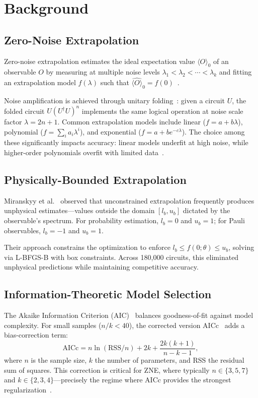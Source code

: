 \section{Background}
\label{sec:background}

\subsection{Zero-Noise Extrapolation}

Zero-noise extrapolation estimates the ideal expectation value $\langle O \rangle_0$ of an observable $O$ by measuring at multiple noise levels $\lambda_1 < \lambda_2 < \cdots < \lambda_k$ and fitting an extrapolation model $f(\lambda)$ such that $\hat{\langle O \rangle}_0 = f(0)$~\cite{Temme2017, Li2017}.

Noise amplification is achieved through unitary folding~\cite{GiurgicaTiron2020}: given a circuit $U$, the folded circuit $U(U^\dagger U)^n$ implements the same logical operation at noise scale factor $\lambda = 2n + 1$. Common extrapolation models include linear ($f = a + b\lambda$), polynomial ($f = \sum_i a_i \lambda^i$), and exponential ($f = a + be^{-c\lambda}$). The choice among these significantly impacts accuracy: linear models underfit at high noise, while higher-order polynomials overfit with limited data~\cite{Cai2023}.

\subsection{Physically-Bounded Extrapolation}

Miranskyy et al.~\cite{Miranskyy2026} observed that unconstrained extrapolation frequently produces unphysical estimates---values outside the domain $[l_b, u_b]$ dictated by the observable's spectrum. For probability estimation, $l_b = 0$ and $u_b = 1$; for Pauli observables, $l_b = -1$ and $u_b = 1$.

Their approach constrains the optimization to enforce $l_b \leq f(0;\theta) \leq u_b$, solving via L-BFGS-B with box constraints. Across 180,000 circuits, this eliminated unphysical predictions while maintaining competitive accuracy.

\subsection{Information-Theoretic Model Selection}

The Akaike Information Criterion (AIC)~\cite{Akaike1974} balances goodness-of-fit against model complexity. For small samples ($n/k < 40$), the corrected version AICc~\cite{Hurvich1989} adds a bias-correction term:
\begin{equation}
    \text{AICc} = n\ln(\text{RSS}/n) + 2k + \frac{2k(k+1)}{n - k - 1},
\end{equation}
where $n$ is the sample size, $k$ the number of parameters, and RSS the residual sum of squares. This correction is critical for ZNE, where typically $n \in \{3, 5, 7\}$ and $k \in \{2, 3, 4\}$---precisely the regime where AICc provides the strongest regularization~\cite{Burnham2002}.

